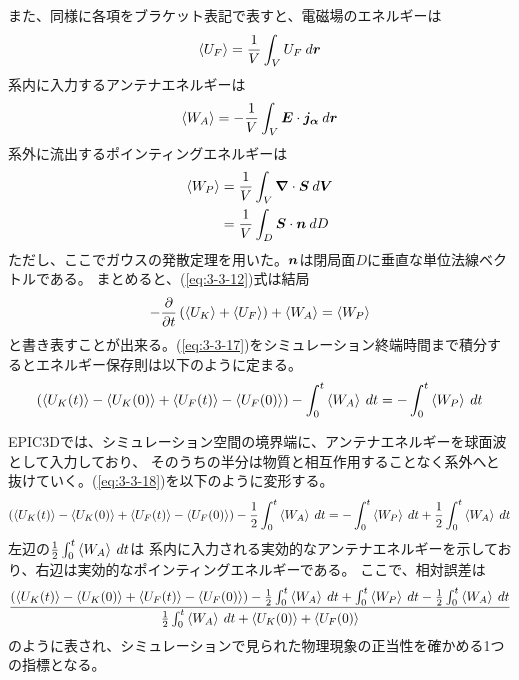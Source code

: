 \documentclass[a4paper,11pt,titlepage]{jarticle}
\newcommand{\bm}[1]{{\mbox{\boldmath $#1$}}}
\numberwithin{equation}{section} %
\begin{document}
  また、同様に各項をブラケット表記で表すと、電磁場のエネルギーは
  \begin{equation}
    \label{eq:3-3-14}
     \ev{U_F} = \frac{1}{V} \int_V U_F \: d\bm{r}
  \end{equation}
  系内に入力するアンテナエネルギーは
  \begin{equation}
    \label{eq:3-3-15}
     \ev{W_A} = - \frac{1}{V} \int_V \bm{E} \cdot \bm{j_\alpha} \: d\bm{r}
  \end{equation}
  系外に流出するポインティングエネルギーは
  \begin{align}
    \label{eq:3-3-16}
    \nonumber
      \ev{W_P} &= \frac{1}{V} \int_V \bm{\nabla} \cdot \bm{S} \: d\bm{V} \\
      &= \frac{1}{V} \int_D \bm{S} \cdot \bm{n} \: dD
  \end{align}
  ただし、ここでガウスの発散定理を用いた。$\bm{n}$は閉局面$D$に垂直な単位法線ベクトルである。
  まとめると、(\ref{eq:3-3-12})式は結局
  \begin{equation}
    \label{eq:3-3-17}
    - \frac{\partial}{\partial t} \left( \ev{U_K} + \ev{U_F} \right) + \ev{W_A} = \ev{W_P}
  \end{equation}
  と書き表すことが出来る。(\ref{eq:3-3-17})をシミュレーション終端時間まで積分するとエネルギー保存則は以下のように定まる。
  \begin{equation}
    \label{eq:3-3-18}
      \left( \ev{U_K(t)} - \ev{U_K(0)} 
      +  \ev{U_F(t)} - \ev{U_F(0)} \right) - \int_0^t \ev{W_A} \: dt 
      = - \int_0^t \ev{W_P} \: dt
  \end{equation}

  EPIC3Dでは、シミュレーション空間の境界端に、アンテナエネルギーを球面波として入力しており、
  そのうちの半分は物質と相互作用することなく系外へと抜けていく。(\ref{eq:3-3-18})を以下のように変形する。
  \begin{equation}
    \label{eq:3-3-19}
      \left( \ev{U_K(t)} - \ev{U_K(0)} 
      +  \ev{U_F(t)} - \ev{U_F(0)} \right) - \frac{1}{2} \int_0^t \ev{W_A} \: dt 
      = - \int_0^t \ev{W_P} \: dt + \frac{1}{2} \int_0^t \ev{W_A} \: dt
  \end{equation}
  左辺の$\frac{1}{2} \int_0^t \ev{W_A} \: dt$は
  系内に入力される実効的なアンテナエネルギーを示しており、右辺は実効的なポインティングエネルギーである。
ここで、相対誤差は
\begin{equation}
  \label{eq:3-3-20}
    \frac{ \left( \ev{U_K(t)} - \ev{U_K(0)} 
    +  \ev{U_F(t)} - \ev{U_F(0)} \right) - \frac{1}{2} \int_0^t \ev{W_A} \: dt 
    + \int_0^t \ev{W_P} \: dt - \frac{1}{2} \int_0^t \ev{W_A} \: dt }
    { \frac{1}{2} \int_0^t \ev{W_A} \: dt + \ev{U_K(0)} + \ev{U_F(0)} }
\end{equation}
のように表され、シミュレーションで見られた物理現象の正当性を確かめる1つの指標となる。
\end{document}
